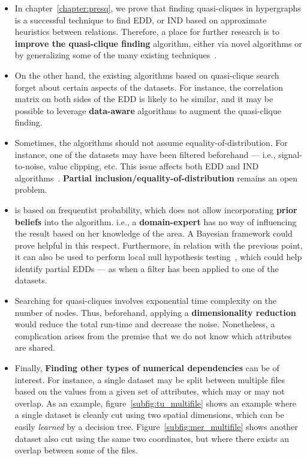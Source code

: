 \begin{itemize}
    \item In chapter~\ref{chapter:presq}, we prove that finding quasi-cliques in hypergraphs
    is a successful technique to find \gls{EDD}, or \gls{IND} based on approximate heuristics
    between relations. Therefore, a place for further research is to
    \textbf{improve the quasi-clique finding} algorithm, either via novel algorithms or by
    generalizing some of the many existing techniques~\cite{WU2015693}.
            
    \item On the other hand, the existing algorithms based on quasi-clique search forget
    about certain aspects of the datasets. For instance, the correlation matrix on both
    sides of the \gls{EDD} is likely to be similar, and it may be possible to leverage
    \textbf{data-aware} algorithms to augment the quasi-clique finding.
    
    \item Sometimes, the algorithms should not assume equality-of-distribution. For instance, one of the
    datasets may have been filtered beforehand --- i.e., signal-to-noise, value clipping, etc. This issue affects
    both \gls{EDD} and \gls{IND} algorithms~\cite{koeller2003discovery}. \textbf{Partial inclusion/equality-of-distribution}
    remains an open problem.
            
    \item \PresQ is based on frequentist probability, which does not allow incorporating \textbf{prior beliefs}
    into the algorithm. i.e., a \textbf{domain-expert} has no way of influencing the result based
    on her knowledge of the area.
    A Bayesian framework could prove helpful in this respect. Furthermore, in relation with the previous point,
    it can also be used to perform local null hypothesis testing~\cite{soriano2015bayesian}, which could help
    identify partial \glspl{EDD} --- as when a filter has been applied to one of the datasets.
    
    \item Searching for quasi-cliques involves exponential time complexity on the number of nodes.
    Thus, beforehand, applying a \textbf{dimensionality reduction} would reduce the total
    run-time and decrease the noise. Nonetheless, a complication arises from the premise that
    we do not know which attributes are shared.
        
    \item Finally, \textbf{Finding other types of numerical dependencies} can be of interest.
    For instance, a single dataset may be split between multiple files based on the values
    from a given set of attributes, which may or may not overlap.
    As an example, figure~\ref{subfig:tu_multifile} shows an example where a single dataset is
    cleanly cut using two spatial dimensions, which can be easily \emph{learned} by a decision tree.
    Figure~\ref{subfig:mer_multifile} shows another dataset also cut using the same two
    coordinates, but where there exists an overlap between some of the files.
\end{itemize}

